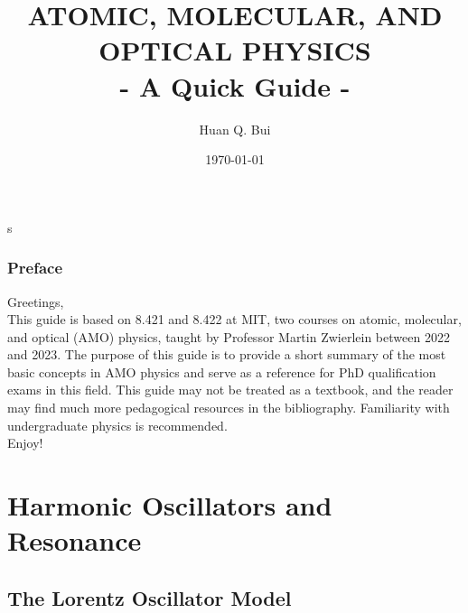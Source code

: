 \documentclass{book}
\theoremstyle{definition}
\begin{document}
	\begin{titlepage}\centering
		\clearpage
		\title{{\textsc{\textbf{ATOMIC, MOLECULAR, AND OPTICAL PHYSICS}}}\\ \smallskip - A Quick Guide - \\}s
		\author{\bigskip Huan Q. Bui}
		\date{\today}
		\maketitle
		\thispagestyle{empty}
	\end{titlepage}

\subsection*{Preface}

Greetings,\\

This guide is based on 8.421 and 8.422 at MIT, two courses on atomic, molecular, and optical (AMO) physics, taught by Professor Martin Zwierlein between 2022 and 2023. The purpose of this guide is to provide a short summary of the most basic concepts in AMO physics and serve as a reference for PhD qualification exams in this field. This guide may not be treated as a textbook, and the reader may find much more pedagogical resources in the bibliography. Familiarity with undergraduate physics is recommended. \\

\noindent Enjoy! 

\newpage
\tableofcontents
\newpage






\chapter{Harmonic Oscillators and Resonance}


\section{The Lorentz Oscillator Model}
\end{document}
